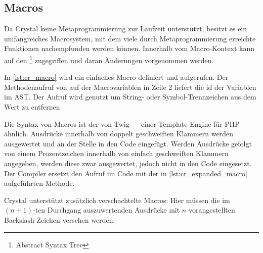 \subsection{Macros}
\label{ssec:gc_macros}

Da Crystal keine Metaprogrammierung zur Laufzeit unterstützt, besitzt es ein
umfangreiches Macrosystem, mit dem viele durch Metaprogrammierung erreichte
Funktionen nachempfunden werden können.  Innerhalb vom Macro-Kontext kann auf
den  \footnote{Abstract Syntax Tree} zugegriffen
und daran Änderungen vorgenommen werden.

In \cref{lst:cr_macro} wird ein einfaches Macro definiert und aufgerufen.
Der Methodenaufruf von  auf der Macrovariablen  in Zeile 2
liefert die id der Variablen im AST.  Der Aufruf wird genutzt um String- oder
Symbol-Trennzeichen aus dem Wert zu entfernen




Die Syntax von Macros ist der von Twig~\cite{twig} -- einer Template-Engine für
PHP -- ähnlich.  Ausdrücke innerhalb von doppelt geschweiften Klammern werden
ausgewertet und an der Stelle in den Code eingefügt.  Werden Ausdrücke gefolgt
von einem Prozentzeichen innerhalb von einfach geschweiften Klammern angegeben,
werden diese zwar ausgewertet, jedoch nicht in den Code eingesetzt.  Der
Compiler ersetzt den Aufruf im Code mit der in \cref{lst:cr_expanded_macro}
aufgeführten Methode.



Crystal unterstützt zusätzlich verschachtelte Macros:  Hier müssen die im $(n +
1)$-ten Durchgang auszuwertenden Ausdrücke mit $n$ vorangestellten
Backslash-Zeichen versehen werden.
